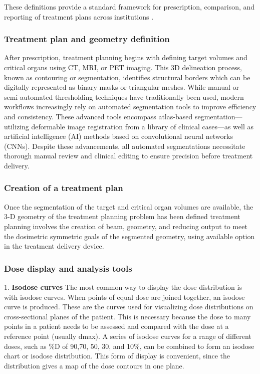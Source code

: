 These definitions provide a standard framework for prescription, comparison, and reporting of treatment plans across institutions \cite{gibbons_khans_2020}.


\subsubsection{Treatment plan and geometry definition}

After prescription, treatment planning begins with defining target volumes and critical organs using CT, MRI, or PET imaging. This 3D delineation process, known as contouring or segmentation, identifies structural borders which can be digitally represented as binary masks or triangular meshes. While manual or semi-automated thresholding techniques have traditionally been used, modern workflows increasingly rely on automated segmentation tools to improve efficiency and consistency. These advanced tools encompass atlas-based segmentation---utilizing deformable image registration from a library of clinical cases---as well as artificial intelligence (AI) methods based on convolutional neural networks (CNNs). Despite these advancements, all automated segmentations necessitate thorough manual review and clinical editing to ensure precision before treatment delivery.


\subsubsection{Creation of a treatment plan}
Once the segmentation of the target and critical organ volumes are available, the 3-D geometry of the treatment planning problem has been defined treatment planning involves the creation of beam, geometry, and reducing output to meet the dosimetric symmetric goals of the segmented geometry, using available option in the treatment delivery device.
\subsubsection{Dose display and analysis tools}
1. \textbf{Isodose curves}
The most common way to display the dose distribution is with isodose curves. When points of equal dose are joined together, an isodose curve is produced. These are the curves used for visualizing dose distributions on cross-sectional planes of the patient. This is necessary because the dose to many points in a patient needs to be assessed and compared with the dose at a reference point (usually dmax). A series of isodose curves for a range of different doses, such as \%D of 90,70, 50, 30, and 10\%, can be combined to form an isodose chart or isodose distribution. This form of display is convenient, since the distribution gives a map of the dose contours in one plane.

